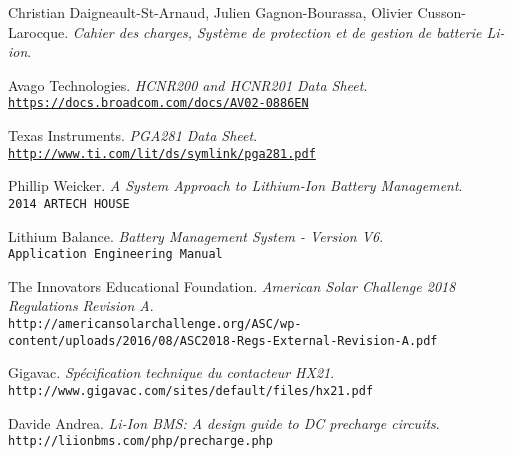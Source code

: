 \documentclass[12pt,letterpaper]{article}
\begin{document}
	\begin{thebibliography}{10}
	
	Christian Daigneault-St-Arnaud, Julien Gagnon-Bourassa, Olivier Cusson-Larocque. \textit{Cahier des charges, Système de protection et de gestion de batterie Li-ion}. \par	
	
	Avago Technologies. \textit{HCNR200 and HCNR201 Data Sheet}.\\ \texttt{\url{https://docs.broadcom.com/docs/AV02-0886EN}}\par
	
	Texas Instruments. \textit{PGA281 Data Sheet}.\\ \texttt{\url{http://www.ti.com/lit/ds/symlink/pga281.pdf}}\par

	Phillip Weicker. \textit{A System Approach to Lithium-Ion Battery Management}.\\ \texttt{2014 ARTECH HOUSE}\par	
	
	Lithium Balance. \textit{Battery Management System - Version V6}.\\ \texttt{Application Engineering Manual}\par	

	The Innovators Educational Foundation. \textit{American Solar Challenge 2018 Regulations Revision A}.\\ \texttt{http://americansolarchallenge.org/ASC/wp-content/uploads/2016/08/ASC2018-Regs-External-Revision-A.pdf}\par	
	
	Gigavac. \textit{Spécification technique du contacteur HX21}.\\ \texttt{http://www.gigavac.com/sites/default/files/hx21.pdf}\par	

	Davide Andrea. \textit{Li-Ion BMS: A design guide to DC precharge circuits}.\\ \texttt{http://liionbms.com/php/precharge.php}\par	


	
	\end{thebibliography}	
	
\end{document}
